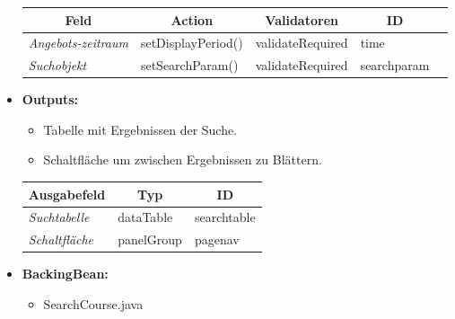 \begin{itemize}
\begin{center}
\begin{longtable}{|p{3cm} |p{4cm} | p{4cm}|p{3cm} |p{2cm}|}
						\hline \multicolumn{1}{|c|}{\textbf{Feld}} & \multicolumn{1}{|c|}{\textbf{Action}} & \multicolumn{1}{|c|}{\textbf{Validatoren}}  &  \multicolumn{1}{|c|}{\textbf{ID}} \\ \hline
						\endfirsthead
						\hline
						\endlastfoot
						\textit{Angebots-zeitraum} & setDisplayPeriod() & validateRequired & time\\ \hline
						\textit{Suchobjekt} & setSearchParam() & validateRequired & searchparam\\ \hline
					\end{longtable}
				\end{center}
			\item \textbf{Outputs:}
			\begin{itemize}
				\item Tabelle mit Ergebnissen der Suche.
				\item Schaltfläche um zwischen Ergebnissen zu Blättern.
			\end{itemize}
					\begin{center}
						\begin{longtable}{|p{5cm} | p{4cm}|p{3cm}|}
							
							\hline \multicolumn{1}{|c|}{\textbf{Ausgabefeld}} & \multicolumn{1}{|c|}{\textbf{Typ}}  &  \multicolumn{1}{|c|}{\textbf{ID}} \\ \hline
							\endfirsthead
							\hline
							\endlastfoot
							\textit{Suchtabelle}  & dataTable & searchtable \\ \hline
							\textit{Schaltfläche}  & panelGroup & pagenav \\ \hline
						\end{longtable}
					\end{center}
			\item \textbf{BackingBean:}
			\begin{itemize}
				\item SearchCourse.java
			\end{itemize}
		\end{itemize}
		
